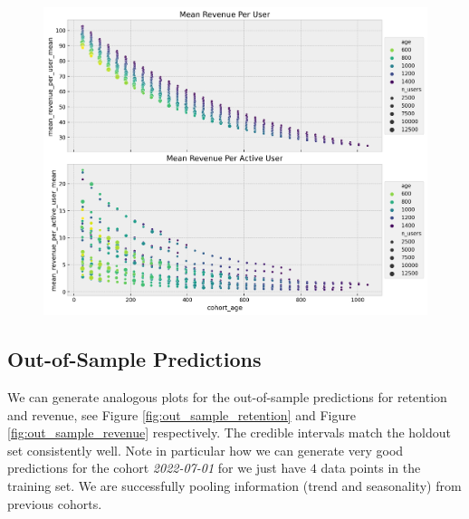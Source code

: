 \documentclass[11pt]{amsart}
\theoremstyle{definition}
\begin{document}
\begin{figure}
    \includegraphics[width=\textwidth]{images/revenue_retention_56_0.png}
\end{figure}

\subsection{Out-of-Sample Predictions}

We can generate analogous plots for the out-of-sample predictions for retention and
revenue, see Figure \ref{fig:out_sample_retention} and Figure 
\ref{fig:out_sample_revenue} respectively. The credible intervals match the holdout set
consistently well. Note in particular how we can generate very good predictions for the 
cohort {\em 2022-07-01} for we just have $4$ data points in the training set. We are 
successfully pooling information (trend and seasonality) from previous cohorts.
\end{document}
